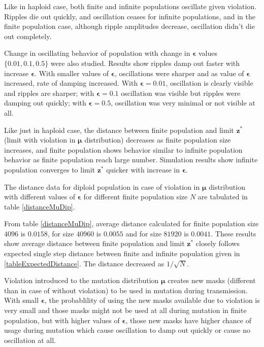 Like in haploid case, both finite and infinite populations oscillate given violation. Ripples die out quickly, 
and oscillation ceases for infinite populations, and in the finite population case, although ripple amplitudes decrease, 
oscillation didn't die out completely. 

Change in oscillating behavior of population with change in $\bm{\epsilon}$ values $\{0.01, 0.1, 0.5\}$ were also studied. 
Results show ripples damp out faster with increase $\bm{\epsilon}$.
With smaller values of $\bm{\epsilon}$, oscillations were sharper and as value of $\bm{\epsilon}$ increased, 
rate of damping increased. With $\bm{\epsilon} = 0.01$, oscillation is clearly visible and ripples are sharper; with $\bm{\epsilon} = 0.1$ oscillation was visible 
but ripples were damping out quickly;  with $\bm{\epsilon} = 0.5$, oscillation was very minimal or not visible at all. 

Like just in haploid case, the distance between finite population and limit $\bm{z}^\ast$ (limit with violation in $\bm{\mu}$ distribution) 
decreases as finite population size increases, 
and finite population shows behavior similar to infinite population behavior as finite population reach large number. 
Simulation results show infinite population converges 
to limit $\bm{z^\ast}$ quicker with increase in $\bm{\epsilon}$. 

The distance data for diploid population in case of violation in $\bm{\mu}$ distribution 
with different values of $\bm{\epsilon}$ for different finite population size $N$ are tabulated in table \ref{distanceMuDip}.



From table \ref{distanceMuDip}, average distance calculated for finite population size $4096$ is $0.0158$, 
for size $40960$ is $0.0055$ and for size $81920$ is $0.0041$. These results show average distance 
between finite population and limit $\bm{z^\ast}$ closely follows expected single step distance 
between finite and infinite population given in \ref{tableExpectedDistance}. The distance decreased as $1/\sqrt{N}$.

Violation introduced to the mutation distribution $\bm{\mu}$ creates new masks (different than in case of without violation) to be used in mutation 
during transmission. With small $\bm{\epsilon}$, the probablility of using the new masks available due to violation is very small and 
those masks might not be used at all during mutation in finite population, but with higher values of $\bm{\epsilon}$, 
those new masks have higher chance of usage during mutation which cause oscillation to damp out quickly or cause no oscillation at all.

